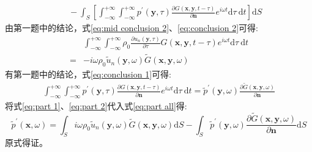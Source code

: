 \begin{enumerate}
\begin{equation}
\begin{aligned}
                &{~~~}- \int_{S} \left[ \int_{-\infty}^{+\infty} \int_{-\infty}^{+\infty} p^{\prime}(\boldsymbol{y}, \tau) \frac{\partial G(\boldsymbol{x}, \boldsymbol{y}, t-\tau)}{\partial \boldsymbol{n}} e^{i \omega t} \mathrm{d} \tau \mathrm{~d} t \right] \mathrm{d} S 
            \end{aligned}
        \end{equation}
        由第一题中的结论，式\eqref{eq:mid conclusion 2}、\eqref{eq:conclusion 2}可得:
        \begin{equation}
            \label{eq:part 1}
            \begin{aligned}
                & \int_{-\infty}^{+\infty} \int_{-\infty}^{+\infty} \rho_{0} \frac{\partial u_{n}(\boldsymbol{y}, \tau)}{\partial \tau} G(\boldsymbol{x}, \boldsymbol{y}, t-\tau) e^{i \omega t} \mathrm{d} \tau \mathrm{~d} t \\
                =& - i \omega \rho_{0} \tilde{u}_{n}(\boldsymbol{y}, \omega) \tilde{G}(\boldsymbol{x}, \boldsymbol{y}, \omega)
            \end{aligned}
        \end{equation}
        有第一题中的结论，式\eqref{eq:conclusion 1}可得:
        \begin{equation}
            \label{eq:part 2}
            \begin{aligned}
                \int_{-\infty}^{+\infty} \int_{-\infty}^{+\infty} p^{\prime}(\boldsymbol{y}, \tau) \frac{\partial G(\boldsymbol{x}, \boldsymbol{y}, t-\tau)}{\partial \boldsymbol{n}} e^{i \omega t} \mathrm{d} \tau \mathrm{~d} t 
                = \tilde{p}^{\prime}(\boldsymbol{y}, \omega) \frac{\partial \tilde{G}(\boldsymbol{x}, \boldsymbol{y}, \omega)}{\partial \boldsymbol{n}}
            \end{aligned}
        \end{equation}
        将式\eqref{eq:part 1}、\eqref{eq:part 2}代入式\eqref{eq:part all}得:
        \begin{equation}
            \tilde{p}^{\prime}(\boldsymbol{x}, \omega)=\int_{S} i \omega \rho_{0} \tilde{u}_{n}(\boldsymbol{y}, \omega) \tilde{G}(\boldsymbol{x}, \boldsymbol{y}, \omega) \mathrm{d} S-\int_{S} \tilde{p}^{\prime}(\boldsymbol{y}, \omega) \frac{\partial \tilde{G}(\boldsymbol{x}, \boldsymbol{y}, \omega)}{\partial \boldsymbol{n}} \mathrm{d} S
        \end{equation}
        原式得证。

\end{enumerate}